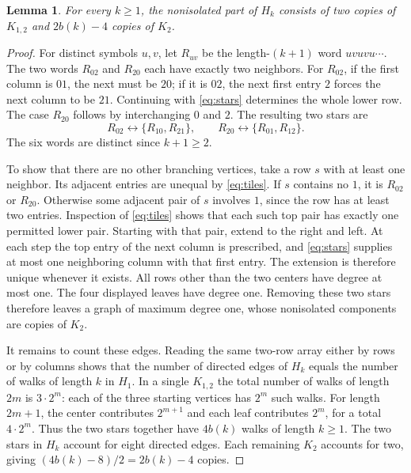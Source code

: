 \documentclass[11pt]{article}
\newtheorem{lemma}{Lemma}
\begin{document}
\begin{lemma}\label{lem:structure}
For every $k\geq1$, the nonisolated part of $H_k$ consists of two copies
of $K_{1,2}$ and $2b(k)-4$ copies of $K_2$.
\end{lemma}
\begin{proof}
For distinct symbols $u,v$, let $R_{uv}$ be the length-$(k+1)$ word
$uvuvu\cdots$. The two words $R_{02}$ and $R_{20}$ each have exactly two
neighbors. For $R_{02}$, if the first column is $01$, the next must be $20$;
if it is $02$, the next first entry $2$ forces the next column to be $21$.
Continuing with \eqref{eq:stars} determines the whole lower row.
The case $R_{20}$ follows by interchanging $0$ and $2$.
The resulting two stars are
\[
 R_{02}\longleftrightarrow\{R_{10},R_{21}\},\qquad
 R_{20}\longleftrightarrow\{R_{01},R_{12}\}.
\]
The six words are distinct since $k+1\geq2$.

To show that there are no other branching vertices, take a row $s$ with
at least one neighbor. Its adjacent entries are unequal by
\eqref{eq:tiles}. If $s$ contains no $1$, it is $R_{02}$ or $R_{20}$.
Otherwise some adjacent pair of $s$ involves $1$, since the row has at
least two entries. Inspection of \eqref{eq:tiles} shows that each such
top pair has exactly one permitted lower pair. Starting with that pair,
extend to the right and left. At each step the top entry of the next
column is prescribed, and \eqref{eq:stars} supplies at most one neighboring
column with that first entry. The extension is therefore unique whenever
it exists. All rows other than the two centers have degree at most one.
The four displayed leaves have degree one. Removing these two stars
therefore leaves a graph of maximum degree one, whose nonisolated
components are copies of $K_2$.

It remains to count these edges. Reading the same two-row array either
by rows or by columns shows that the number of directed edges of $H_k$
equals the number of walks of length $k$ in $H_1$.
In a single $K_{1,2}$ the total number of walks of length $2m$ is
$3\cdot2^m$: each of the three starting vertices has $2^m$ such walks.
For length $2m+1$, the center contributes $2^{m+1}$ and each leaf
contributes $2^m$, for a total $4\cdot2^m$.
Thus the two stars together have $4b(k)$ walks of length $k\geq1$.
The two stars in $H_k$ account for eight directed edges. Each remaining
$K_2$ accounts for two, giving $(4b(k)-8)/2=2b(k)-4$ copies.
\end{proof}
\end{document}
